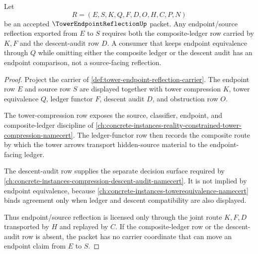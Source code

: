 \begin{theorem}
\label{thm:tower-endpoint-reflection-descent-boundary}
Let
$$
R=(E,S,K,Q,F,D,O,H,C,P,N)
$$
be an accepted $\TowerEndpointReflectionUp$ packet. Any endpoint/source reflection exported from $E$ to $S$ requires both the composite-ledger row carried by $K,F$ and the descent-audit row $D$. A consumer that keeps endpoint equivalence through $Q$ while omitting either the composite ledger or the descent audit has an endpoint comparison, not a source-facing reflection.
\end{theorem}
\begin{proof}
Project the carrier of \autoref{def:tower-endpoint-reflection-carrier}. The endpoint row $E$ and source row $S$ are displayed together with tower compression $K$, tower equivalence $Q$, ledger functor $F$, descent audit $D$, and obstruction row $O$.

The tower-compression row exposes the source, classifier, endpoint, and composite-ledger discipline of \autoref{ch:concrete-instances-reality-constrained-tower-compression-namecert}. The ledger-functor row then records the composite route by which the tower arrows transport hidden-source material to the endpoint-facing ledger.

The descent-audit row supplies the separate decision surface required by \autoref{ch:concrete-instances-compression-descent-audit-namecert}. It is not implied by endpoint equivalence, because \autoref{ch:concrete-instances-towerequivalence-namecert} binds agreement only when ledger and descent compatibility are also displayed.

Thus endpoint/source reflection is licensed only through the joint route $K,F,D$ transported by $H$ and replayed by $C$. If the composite-ledger row or the descent-audit row is absent, the packet has no carrier coordinate that can move an endpoint claim from $E$ to $S$.
\end{proof}

